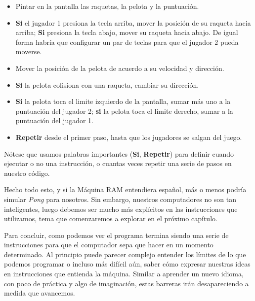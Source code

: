 \begin{itemize}
	\begin{itemize}
		\item Pintar en la pantalla las raquetas, la pelota y la puntuación.
		
		\item \textbf{Si} el jugador 1 presiona la tecla arriba, mover la posición de su raqueta hacia arriba; \textbf{Si} presiona la tecla abajo, mover su raqueta hacia abajo. De igual forma habría que configurar un par de teclas para que el jugador 2 pueda moverse.
		
		\item Mover la posición de la pelota de acuerdo a su velocidad y dirección.
		
		\item \textbf{Si} la pelota colisiona con una raqueta, cambiar su dirección.
		
		\item \textbf{Si} la pelota toca el limite izquierdo de la pantalla, sumar más uno a la puntuación del jugador 2; \textbf{si} la pelota toca el limite derecho, sumar a la puntuación del jugador 1.
				
		\item \textbf{Repetir} desde el primer paso, hasta que los jugadores se salgan del juego.
	\end{itemize}
\end{itemize}

Nótese que usamos palabras importantes (\textbf{Si}, \textbf{Repetir}) para definir cuando ejecutar o no una instrucción, o cuantas veces repetir una serie de pasos en nuestro código.

Hecho todo esto, y si la Máquina RAM entendiera español, más o menos podría simular \emph{Pong} para nosotros. Sin embargo, nuestros computadores no son tan inteligentes, luego debemos ser mucho más explícitos en las instrucciones que utilizamos, tema que comenzaremos a explorar en el próximo capítulo.

Para concluir, como podemos ver el programa termina siendo una serie de instrucciones para que el computador sepa que hacer en un momento determinado. Al principio puede parecer complejo entender los límites de lo que podemos programar o incluso más difícil aún, saber cómo expresar nuestras ideas en instrucciones que entienda la máquina. Similar a aprender un nuevo idioma, con poco de práctica y algo de imaginación, estas barreras irán desapareciendo a medida que avancemos.

\newpage

